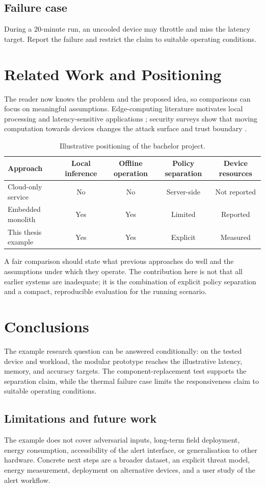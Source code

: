 \section{Failure case}
During a 20-minute run, an uncooled device may throttle and miss the latency target. Report the failure and restrict the claim to suitable operating conditions.

\chapter{Related Work and Positioning}\label{ch:b-related}
The reader now knows the problem and the proposed idea, so comparisons can focus on meaningful assumptions. Edge-computing literature motivates local processing and latency-sensitive applications \cite{shi2016edge}; security surveys show that moving computation towards devices changes the attack surface and trust boundary \cite{roman2018mobile}.

\begin{table}[htbp]
\centering
\caption{Illustrative positioning of the bachelor project.}
\label{tab:b-related}
\begin{tabularx}{\textwidth}{Ycccc}
\toprule
Approach & Local inference & Offline operation & Policy separation & Device resources\\
\midrule
Cloud-only service & No & No & Server-side & Not reported\\
Embedded monolith & Yes & Yes & Limited & Reported\\
This thesis example & Yes & Yes & Explicit & Measured\\
\bottomrule
\end{tabularx}
\end{table}

A fair comparison should state what previous approaches do well and the assumptions under which they operate. The contribution here is not that all earlier systems are inadequate; it is the combination of explicit policy separation and a compact, reproducible evaluation for the running scenario.

\chapter{Conclusions}
The example research question can be answered conditionally: on the tested device and workload, the modular prototype reaches the illustrative latency, memory, and accuracy targets. The component-replacement test supports the separation claim, while the thermal failure case limits the responsiveness claim to suitable operating conditions.

\section{Limitations and future work}
The example does not cover adversarial inputs, long-term field deployment, energy consumption, accessibility of the alert interface, or generalisation to other hardware. Concrete next steps are a broader dataset, an explicit threat model, energy measurement, deployment on alternative devices, and a user study of the alert workflow.

